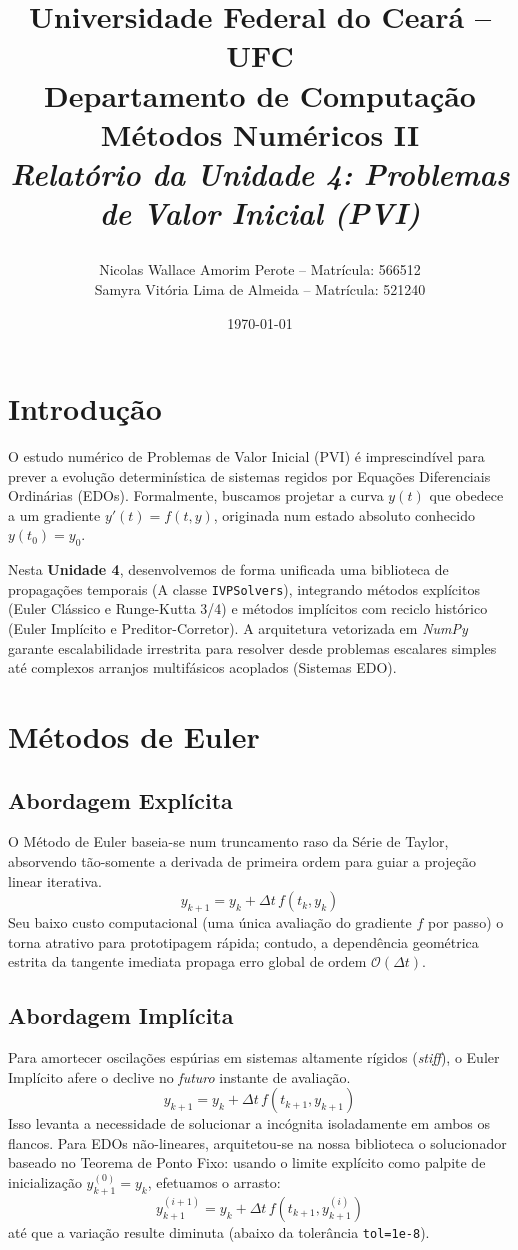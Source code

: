 \documentclass[12pt,a4paper]{article}
\title{
    \vspace{-1cm}
    \begin{center}
        \Large \textbf{Universidade Federal do Ceará -- UFC} \\
        \large Departamento de Computação \\
        \vspace{1cm}
        \Huge \textbf{Métodos Numéricos II} \\
        \vspace{0.5cm}
        \Large \textit{Relatório da Unidade 4: Problemas de Valor Inicial (PVI)}
    \end{center}
}
\author{
    Nicolas Wallace Amorim Perote -- Matrícula: 566512 \\
    Samyra Vitória Lima de Almeida -- Matrícula: 521240
}
\date{\today}
\begin{document}
\maketitle
\tableofcontents
\newpage

\section{Introdução}
O estudo numérico de Problemas de Valor Inicial (PVI) é imprescindível para prever a evolução determinística de sistemas regidos por Equações Diferenciais Ordinárias (EDOs). Formalmente, buscamos projetar a curva $y(t)$ que obedece a um gradiente $y'(t)=f(t,y)$, originada num estado absoluto conhecido $y(t_0)=y_0$.

Nesta \textbf{Unidade 4}, desenvolvemos de forma unificada uma biblioteca de propagações temporais (A classe \texttt{IVPSolvers}), integrando métodos explícitos (Euler Clássico e Runge-Kutta 3/4) e métodos implícitos com reciclo histórico (Euler Implícito e Preditor-Corretor). A arquitetura vetorizada em \textit{NumPy} garante escalabilidade irrestrita para resolver desde problemas escalares simples até complexos arranjos multifásicos acoplados (Sistemas EDO).

\section{Métodos de Euler}
\subsection{Abordagem Explícita}
O Método de Euler baseia-se num truncamento raso da Série de Taylor, absorvendo tão-somente a derivada de primeira ordem para guiar a projeção linear iterativa.
\begin{equation}
y_{k+1}=y_k+\Delta t\,f(t_k,y_k)
\end{equation}
Seu baixo custo computacional (uma única avaliação do gradiente $f$ por passo) o torna atrativo para prototipagem rápida; contudo, a dependência geométrica estrita da tangente imediata propaga erro global de ordem $\mathcal{O}(\Delta t)$.

\subsection{Abordagem Implícita}
Para amortecer oscilações espúrias em sistemas altamente rígidos (\textit{stiff}), o Euler Implícito afere o declive no \textit{futuro} instante de avaliação.
\begin{equation}
y_{k+1}=y_k+\Delta t\,f(t_{k+1},y_{k+1})
\end{equation}
Isso levanta a necessidade de solucionar a incógnita isoladamente em ambos os flancos. Para EDOs não-lineares, arquitetou-se na nossa biblioteca o solucionador baseado no Teorema de Ponto Fixo: usando o limite explícito como palpite de inicialização $y_{k+1}^{(0)} = y_k$, efetuamos o arrasto:
\begin{equation}
y_{k+1}^{(i+1)} = y_k + \Delta t\, f(t_{k+1}, y_{k+1}^{(i)})
\end{equation}
até que a variação resulte diminuta (abaixo da tolerância \texttt{tol=1e-8}).
\end{document}
